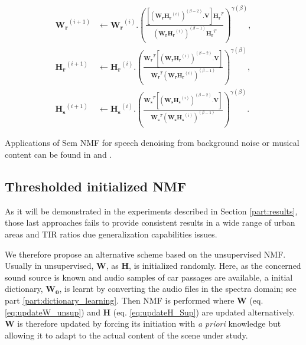 \documentclass[twocolumn,a4paper,10pt]{article}
\begin{document}
{\scriptsize
\begin{subequations}\label{eq:WH-SSupdate}
\begin{align}
\mathbf{W_r}^{(i+1)} &\leftarrow \mathbf{W_r}^{(i)}.\left(\frac{\left[\left(\mathbf{W_r H_r}^{(i)} \right)^{(\beta-2)}.\mathbf{V} \right]\mathbf{H_r}^T}{\left(\mathbf{W_r H_r}^{(i)} \right)^{(\beta-1)}\mathbf{H_r}^T}\right)^{\gamma(\beta)}, \label{eq:W_r_SS}\\
\mathbf{H_r}^{(i+1)} &\leftarrow \mathbf{H_r}^{(i)}.\left(\frac{\mathbf{W_r}^T \left[\left(\mathbf{W_r H_r}^{(i)} \right)^{(\beta-2)}.\mathbf{V} \right]}{\mathbf{W_r}^T \left(\mathbf{W_r H_r}^{(i)} \right)^{(\beta-1)}}\right)^{\gamma(\beta)}, \label{eq:H_r_SS}\\
\mathbf{H_s}^{(i+1)} &\leftarrow \mathbf{H_s}^{(i)}.\left(\frac{\mathbf{W_s}^T \left[\left(\mathbf{W_s H_s}^{(i)} \right)^{(\beta-2)}.\mathbf{V} \right]}{\mathbf{W_s}^T \left(\mathbf{W_s H_s}^{(i)} \right)^{(\beta-1)}}\right)^{\gamma(\beta)}.\label{eq:H_s_SS}
\end{align}
\end{subequations}}

Applications of Sem NMF for speech denoising from background noise or musical content can be found in \cite{joder2012real} and \cite{weninger2012supervised}.

\subsection{Thresholded initialized NMF}

As it will be demonstrated in the experiments described in Section \ref{part:results}, those last approaches fails to provide consistent results in a wide range of urban areas and TIR ratios due generalization capabilities issues.

We therefore propose an alternative scheme based on the unsupervised NMF. Usually in unsupervised, $\mathbf{W}$, as  $\mathbf{H}$, is initialized randomly. Here, as the concerned sound source is known and audio samples of car passages are available, a initial dictionary, $\mathbf{W_0}$, is learnt by converting the audio files in the spectra domain; see part \ref{part:dictionary_learning}. Then NMF is performed where $\mathbf{W}$ (eq. \ref{eq:updateW_unsup}) and $\mathbf{H}$ (eq.  \ref{eq:updateH_Sup}) are updated alternatively. $\mathbf{W}$ is therefore updated by forcing its initiation with \textit{a priori} knowledge but allowing it to adapt to the actual content of the scene under study.
\end{document}
